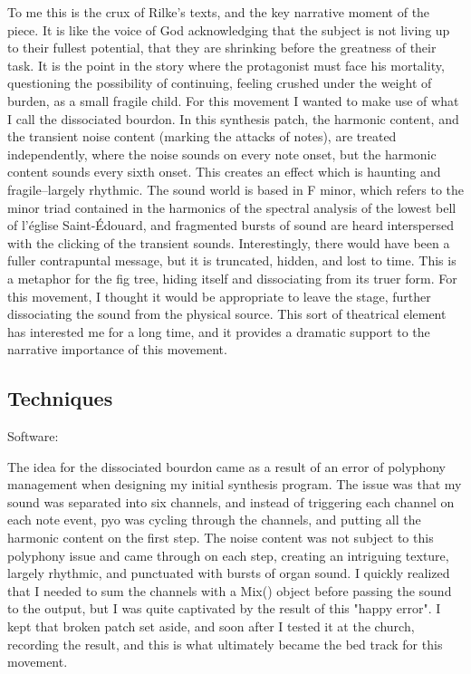 \documentclass[12pt,twoside,maitrise]{dms_ks}
\theoremstyle{definition}
\begin{document}
To me this is the crux of Rilke's texts, and the key narrative moment of the piece.
It is like the voice of God acknowledging that the subject is not living up to their fullest potential, that they are shrinking before the greatness of their task.
It is the point in the story where the protagonist must face his mortality, questioning the possibility of continuing, feeling crushed under the weight of burden, as a small fragile child.
For this movement I wanted to make use of what I call the dissociated bourdon.
In this synthesis patch, the harmonic content, and the transient noise content (marking the attacks of notes), are treated independently, where the noise sounds on every note onset, but the harmonic content sounds every sixth onset.
This creates an effect which is haunting and fragile--largely rhythmic.
The sound world is based in F minor, which refers to the minor triad contained in the harmonics of the spectral analysis of the lowest bell of l'église Saint-Édouard, and fragmented bursts of sound are heard interspersed with the clicking of the transient sounds.
Interestingly, there would have been a fuller contrapuntal message, but it is truncated, hidden, and lost to time.
This is a metaphor for the fig tree, hiding itself and dissociating from its truer form.
For this movement, I thought it would be appropriate to leave the stage, further dissociating the sound from the physical source.
This sort of theatrical element has interested me for a long time, and it provides a dramatic support to the narrative importance of this movement.

\subsection{Techniques}

Software:

The idea for the dissociated bourdon came as a result of an error of polyphony management when designing my initial synthesis program.
The issue was that my sound was separated into six channels, and instead of triggering each channel on each note event, pyo was cycling through the channels, and putting all the harmonic content on the first step.
The noise content was not subject to this polyphony issue and came through on each step, creating an intriguing texture, largely rhythmic, and punctuated with bursts of organ sound.
I quickly realized that I needed to sum the channels with a Mix() object before passing the sound to the output, but I was quite captivated by the result of this "happy error".
I kept that broken patch set aside, and soon after I tested it at the church, recording the result, and this is what ultimately became the bed track for this movement.
\end{document}

